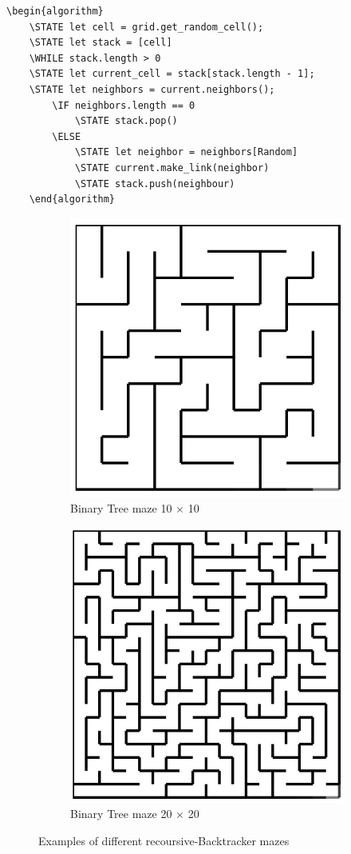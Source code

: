 \begin{lstlisting}[caption={Pseudocode for a Recursive-Backtracker algorithm}]
	\begin{algorithm}
	\STATE let cell = grid.get_random_cell();
	\STATE let stack = [cell]
	\WHILE stack.length > 0
	\STATE let current_cell = stack[stack.length - 1];
	\STATE let neighbors = current.neighbors();
		\IF neighbors.length == 0
			\STATE stack.pop()
		\ELSE 
			\STATE let neighbor = neighbors[Random]
			\STATE current.make_link(neighbor)
			\STATE stack.push(neighbour)	
	\end{algorithm}
	\end{lstlisting}
\newline
\begin{figure}[!h]
    \centering
    \begin{subfigure}{.45\textwidth}
    \centering
    \includegraphics[width=.6\linewidth]{recursive1010.png}
    \caption{Binary Tree maze 10 $\times$ 10}
    \label{fig:sub1}
    \end{subfigure}
    \begin{subfigure}{.45\textwidth}
    \centering
    \includegraphics[width=.6\linewidth]{recursive2020.png}
    \caption{Binary Tree maze 20 $\times$ 20}
    \label{fig:sub2}
    \end{subfigure}
    \caption{Examples of different recoursive-Backtracker mazes}
    \label{fig:test}
    \end{figure}
